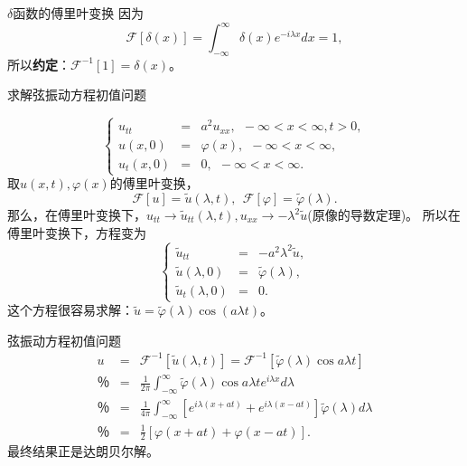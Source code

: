 \documentclass[11pt]{beamer}
\begin{document}
\begin{frame}{$\delta$函数的傅里叶变换}
因为　
\begin{equation}
\mathscr{F}[ \delta(x) ] = \int^\infty_{-\infty} \delta(x) e^{-i\lambda x} dx = 1,
\end{equation}
所以{\bf 约定}：$\mathscr{F}^{-1} [1] = \delta(x)$。
\end{frame}

\begin{frame}{求解弦振动方程初值问题}

\begin{equation}
\left\{
\begin{aligned}
u_{tt} &=& a^2 u_{xx},  ~~ -\infty < x < \infty, t>0, \\
u(x,0) &=& \varphi(x), ~~ -\infty < x < \infty, \\
u_t(x,0) &=& 0, ~~ -\infty < x < \infty.
\end{aligned}
\right.
\end{equation}
取$u(x,t),\varphi(x)$的傅里叶变换，
\begin{equation}
\mathscr{F}[ u ] = \tilde{u}(\lambda,t), ~~ \mathscr{F}[ \varphi ] = \tilde{\varphi}(\lambda).
\end{equation}
那么，在傅里叶变换下，$u_{tt} \rightarrow \tilde{u}_{tt} (\lambda,t), u_{xx} \rightarrow - \lambda^2 \tilde{u}$(原像的导数定理)。
所以在傅里叶变换下，方程变为
\begin{equation}
\left\{
\begin{aligned}
\tilde{u}_{tt} &=& - a^2 \lambda^2 \tilde{u}, \\
\tilde{u}(\lambda,0) &=& \tilde{\varphi}(\lambda), \\
\tilde{u}_t(\lambda,0) &=& 0.
\end{aligned}
\right.
\end{equation}
这个方程很容易求解：$\tilde{u} = \tilde{\varphi}(\lambda) \cos(a\lambda t)$。
\end{frame}

\begin{frame}{弦振动方程初值问题}
\begin{eqnarray}
u &=& \mathscr{F}^{-1} [ \tilde{u} (\lambda, t) ] = \mathscr{F}^{-1}[ \tilde{\varphi}(\lambda) \cos a \lambda t ] \nonumber\\
％&=& \frac{1}{2\pi} \int^\infty_{-\infty} \tilde{\varphi}(\lambda) \cos a \lambda t e^{i\lambda x} d\lambda \nonumber\\
％&=& \frac{1}{4\pi}\int^\infty_{-\infty} [ e^{i \lambda(x+at)} + e^{i\lambda(x-at)} ] \tilde{\varphi}(\lambda) d\lambda \nonumber\\
％&=& \frac{1}{2}[ \varphi(x+at) + \varphi(x-at) ].
\end{eqnarray}
最终结果正是达朗贝尔解。
\end{frame}
\end{document}
